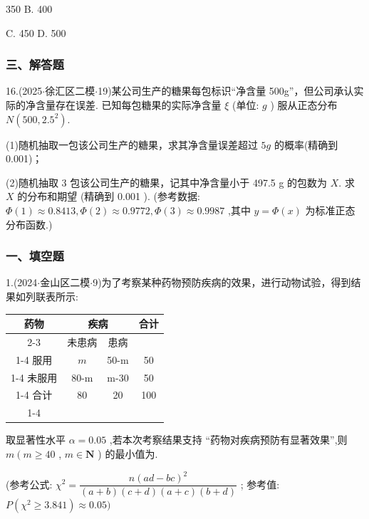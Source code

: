 \xx{}{}{}{}350 B. 400

C. 450 D. 500

\subsubsection*{三、解答题}

16.(2025$\cdot$徐汇区二模$\cdot$19)某公司生产的糖果每包标识“净含量 500g”，但公司承认实际的净含量存在误差. 已知每包糖果的实际净含量 $\xi$ (单位: ${g}$ ) 服从正态分布 $N\left( {{500},{2.5}^{2}}\right)$.

(1)随机抽取一包该公司生产的糖果，求其净含量误差超过 $5{g}$ 的概率(精确到 0.001)；

(2)随机抽取 3 包该公司生产的糖果，记其中净含量小于 497.5 g 的包数为 $X$. 求 $X$ 的分布和期望 (精确到 0.001 ). (参考数据: $\Phi \left( 1\right)  \approx  {0.8413},\Phi \left( 2\right)  \approx  {0.9772},\Phi \left( 3\right)  \approx  {0.9987}$ ,其中 $y =  \Phi \left( x\right)$ 为标准正态分布函数.)

\subsubsection*{一、填空题}

1.(2024$\cdot$金山区二模$\cdot$9)为了考察某种药物预防疾病的效果，进行动物试验，得到结果如列联表所示:

\begin{center}

\begin{tabular}{|c|c|c|c|}
\hline
\multirow{2}{*}{药物} & \multicolumn{2}{|c|}{疾病} & \multirow{2}{*}{合计} \\
\cline{2-3}
 & 未患病 & 患病 &  \\
\cline{1-4}
服用 & $m$ & 50-m & 50 \\
\cline{1-4}
未服用 & 80-m & m-30 & 50 \\
\cline{1-4}
合计 & 80 & 20 & 100 \\
\cline{1-4}
\hline
\end{tabular}
\end{center}

取显著性水平 $\alpha  = {0.05}$ ,若本次考察结果支持 “药物对疾病预防有显著效果”,则 $m\left( {m \geq  {40}}\right.$ , $m \in  \mathbf{N}$ ) 的最小值为\blkda[2]{}.

(参考公式: ${\chi }^{2} = \dfrac{n{\left( ad - bc\right) }^{2}}{\left( {a + b}\right) \left( {c + d}\right) \left( {a + c}\right) \left( {b + d}\right) }$ ; 参考值: $P\left( {{\chi }^{2} \geq  {3.841}}\right)  \approx  {0.05})$

